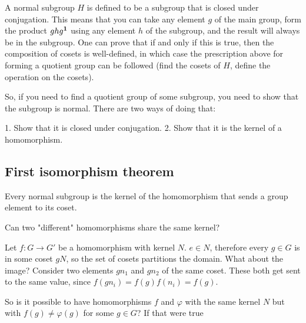 A normal subgroup $H$ is defined to be a subgroup that is closed under
conjugation. This means that you can take any element $g$ of the main group,
form the product $ghg^{\mathbf 1}$ using any element $h$ of the subgroup, and the result
will always be in the subgroup. One can prove that if and only if this is true,
then the composition of cosets is well-defined, in which case the prescription
above for forming a quotient group can be followed (find the cosets of $H$,
define the operation on the cosets).

So, if you need to find a quotient group of some subgroup, you need to show
that the subgroup is normal. There are two ways of doing that:

1. Show that it is closed under conjugation.
2. Show that it is the kernel of a homomorphism.



\subsection{First isomorphism theorem}


Every normal subgroup is the kernel of the homomorphism that sends a group element to its coset.

Can two "different" homomorphisms share the same kernel?

Let $f: G \rightarrow G'$ be a homomorphism with kernel $N$. $e \in N$,
therefore every $g \in G$ is in some coset $gN$, so the set of cosets
partitions the domain. What about the image? Consider two elements $gn_1$ and
$gn_2$ of the same coset. These both get sent to the same value, since
$f(gn_i) = f(g)f(n_i) = f(g)$.

So is it possible to have homomorphisms $f$ and $\varphi$ with the same kernel
$N$ but with $f(g) \neq \varphi(g)$ for some $g \in G$? If that were true
